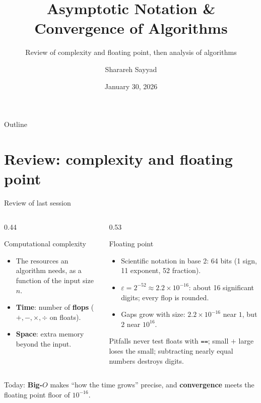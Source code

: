 \documentclass[aspectratio=169]{beamer}
\title{Asymptotic Notation \& Convergence of Algorithms}
\subtitle{Review of complexity and floating point, then analysis of algorithms}
\author{Sharareh Sayyad}
\institute{Washington state University}
\date{January 30, 2026}
\begin{document}
\frame{\titlepage}

\begin{frame}{Outline}
\tableofcontents
\end{frame}

\section{Review: complexity and floating point}

\begin{frame}{Review of last session}
\begin{columns}[T]
\begin{column}{0.44\textwidth}
\begin{block}{Computational complexity}
\small
\begin{itemize}
  \item The resources an algorithm needs, as a function of the input size $n$.
  \item \textbf{Time}: number of \textbf{flops} ($+,-,\times,\div$ on floats).
  \item \textbf{Space}: extra memory beyond the input.
\end{itemize}
\end{block}
\end{column}
\begin{column}{0.53\textwidth}
\begin{block}{Floating point}
\small
\begin{itemize}
  \item Scientific notation in base 2: 64 bits (1 sign, 11 exponent, 52 fraction).
  \item $\varepsilon = 2^{-52} \approx 2.2\times10^{-16}$: about 16 significant digits; every flop is rounded.
  \item Gaps grow with size: $2.2\times10^{-16}$ near $1$, but $2$ near $10^{16}$.
\end{itemize}
\end{block}
\begin{alertblock}{Pitfalls}
\footnotesize never test floats with \texttt{==}; small $+$ large loses the small; subtracting nearly equal numbers destroys digits.
\end{alertblock}
\end{column}
\end{columns}
\vspace{0.2cm}
\centering\scriptsize Today: \textbf{Big-$O$} makes ``how the time grows'' precise, and \textbf{convergence} meets the floating point floor of $10^{-16}$.
\end{frame}
\end{document}
